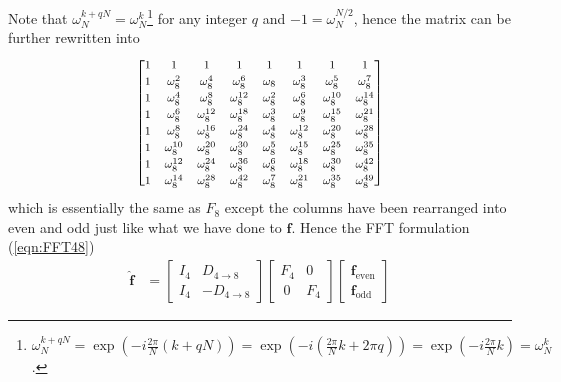 Note that $\omega_N^{k + qN} = \omega_N^k$\footnote{\label{foot:DFTcyclicexp}$\omega_N^{k + qN} = \exp(-i\frac{2\pi}{N}(k+qN)) = \exp(-i(\frac{2\pi}{N}k + 2\pi q)) = \exp(-i\frac{2\pi}{N}k) = \omega_N^{k}$.} for any integer $q$ and $-1 = \omega_N^{N/2}$, hence the matrix can be further rewritten into
\begin{align}
\renewcommand\arraystretch{1.25}
\footnotesize
\begin{bmatrix}
1 & 1 & 1 & 1 & 1 & 1 & 1 & 1 \\
1 & \omega_8^2 & \omega_8^4 & \omega_8^6 & \omega_8 & \omega_8^3 & \omega_8^5 & \omega_8^7 \\
1 & \omega_8^4 & \omega_8^8 & \omega_8^{12} & \omega_8^2 & \omega_8^6 & \omega_8^{10} & \omega_8^{14} \\
1 & \omega_8^6 & \omega_8^{12} & \omega_8^{18} & \omega_8^3 & \omega_8^9 & \omega_8^{15} & \omega_8^{21} \\
1 & \omega_8^8 & \omega_8^{16} & \omega_8^{24} & \omega_8^4 & \omega_8^{12} & \omega_8^{20} & \omega_8^{28} \\
1 & \omega_8^{10} & \omega_8^{20} & \omega_8^{30} & \omega_8^5 & \omega_8^{15} & \omega_8^{25} & \omega_8^{35} \\
1 & \omega_8^{12} & \omega_8^{24} & \omega_8^{36} & \omega_8^6 & \omega_8^{18} & \omega_8^{30} & \omega_8^{42} \\
1 & \omega_8^{14} & \omega_8^{28} & \omega_8^{42} & \omega_8^7 & \omega_8^{21} & \omega_8^{35} & \omega_8^{49} \\
\end{bmatrix}    
\end{align}
which is essentially the same as $F_8$ except the columns have been rearranged into even and odd just like what we have done to $\textbf{f}$. Hence the FFT formulation (\ref{eqn:FFT48})
\begin{align*}
\hat{\textbf{f}} &= 
\begin{bmatrix}
I_4 & D_{4 \to 8} \\
I_4 & -D_{4 \to 8}
\end{bmatrix}
\begin{bmatrix}
F_4 & 0 \\\
0 & F_4
\end{bmatrix}
\begin{bmatrix}
\textbf{f}_{\text{even}} \\
\textbf{f}_{\text{odd}}
\end{bmatrix}
\end{align*}
